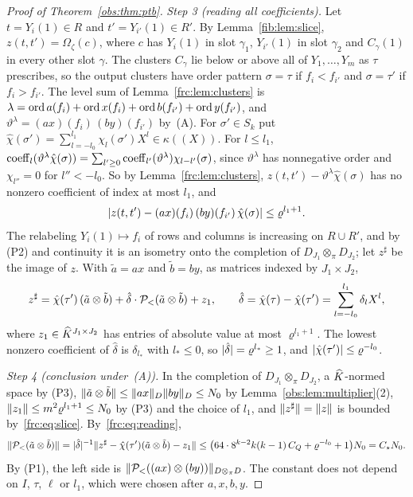 \begin{proof}[Proof of Theorem~\ref{obs:thm:ptb}]
\emph{Step 3 (reading all coefficients).} Let $t=Y_i(1)\in R$ and $t'=Y_{i'}(1)\in R'$. By Lemma~\ref{fib:lem:slice},
$z(t,t')=\Omega_\zeta(c)$, where $c$ has $Y_i(1)$ in slot $\gamma_1$, $Y_{i'}(1)$ in slot $\gamma_2$ and $C_\gamma(1)$ in
every other slot $\gamma$. The clusters $C_\gamma$ lie below or above all of $Y_1,\dots,Y_m$ as $\tau$ prescribes, so the
output clusters have order pattern $\sigma=\tau$ if $f_i<f_{i'}$ and $\sigma=\tau'$ if $f_i>f_{i'}$. The level sum of
Lemma~\ref{frc:lem:clusters} is $\lambda=\operatorname{ord} a(f_i)+\operatorname{ord} x(f_i)+\operatorname{ord} b(f_{i'})+\operatorname{ord} y(f_{i'})$, and
$\vartheta^\lambda=(ax)(f_i)\,(by)(f_{i'})$ by~(A). For $\sigma'\in S_k$ put
$\hat\chi(\sigma')=\sum_{l=-l_0}^{l_1}\chi_l(\sigma')X^l\in\kappa((X))$. For $l\le l_1$,
$\operatorname{coeff}_l(\vartheta^\lambda\hat\chi(\sigma))=\sum_{l'\ge0}\operatorname{coeff}_{l'}(\vartheta^\lambda)\chi_{l-l'}(\sigma)$, since
$\vartheta^\lambda$ has nonnegative order and $\chi_{l''}=0$ for $l''<-l_0$. So by Lemma~\ref{frc:lem:clusters},
$z(t,t')-\vartheta^\lambda\hat\chi(\sigma)$ has no nonzero coefficient of index at most $l_1$, and
\[
 \lvert z(t,t')-(ax)(f_i)\,(by)(f_{i'})\,\hat\chi(\sigma)\rvert\le\varrho^{l_1+1}.
\]
The relabeling $Y_i(1)\mapsto f_i$ of rows and columns is increasing on $R\cup R'$, and by (P2) and continuity it is an
isometry onto the completion of $D_{J_1}\otimes_\pi D_{J_2}$; let $z^\sharp$ be the image of $z$. With $\tilde a=ax$ and
$\tilde b=by$, as matrices indexed by $J_1\times J_2$,
\begin{equation}\label{frc:eq:reading}
 z^\sharp=\hat\chi(\tau')\,(\tilde a\otimes\tilde b)+\hat\delta\cdot\mathcal P_<(\tilde a\otimes\tilde b)+z_1,\qquad
 \hat\delta=\hat\chi(\tau)-\hat\chi(\tau')=\sum_{l=-l_0}^{l_1}\delta_lX^l,
\end{equation}
where $z_1\in\widehat K^{J_1\times J_2}$ has entries of absolute value at most $\varrho^{l_1+1}$. The lowest nonzero coefficient
of $\hat\delta$ is $\delta_{l_*}$ with $l_*\le0$, so $\lvert \hat\delta\rvert=\varrho^{l_*}\ge1$, and $\lvert \hat\chi(\tau')\rvert\le\varrho^{-l_0}$.

\emph{Step 4 (conclusion under~(A)).} In the completion of $D_{J_1}\otimes_\pi D_{J_2}$, a $\widehat K$\nobreakdash-normed space
by (P3), $\lVert \tilde a\otimes\tilde b\rVert\le\lVert ax\rVert_D\lVert by\rVert_D\le N_0$ by Lemma~\ref{obs:lem:multiplier}(2),
$\lVert z_1\rVert\le m^2\varrho^{l_1+1}\le N_0$ by (P3) and the choice of $l_1$, and $\lVert z^\sharp\rVert=\lVert z\rVert$ is bounded
by~\eqref{frc:eq:slice}. By~\eqref{frc:eq:reading},
\[
 \lVert \mathcal P_<(\tilde a\otimes\tilde b)\rVert=\lvert \hat\delta\rvert^{-1}\lVert z^\sharp-\hat\chi(\tau')(\tilde a\otimes\tilde b)-z_1\rVert
 \le\bigl(64\cdot8^{k-2}k(k-1)\,C_Q+\varrho^{-l_0}+1\bigr)N_0=C_\star N_0 .
\]
By (P1), the left side is $\lVert \mathcal P_<((ax)\otimes(by))\rVert_{D\otimes_\pi D}$. The constant does not depend on $I$, $\tau$,
$\ell$ or $l_1$, which were chosen after $a,x,b,y$.


\end{proof}
